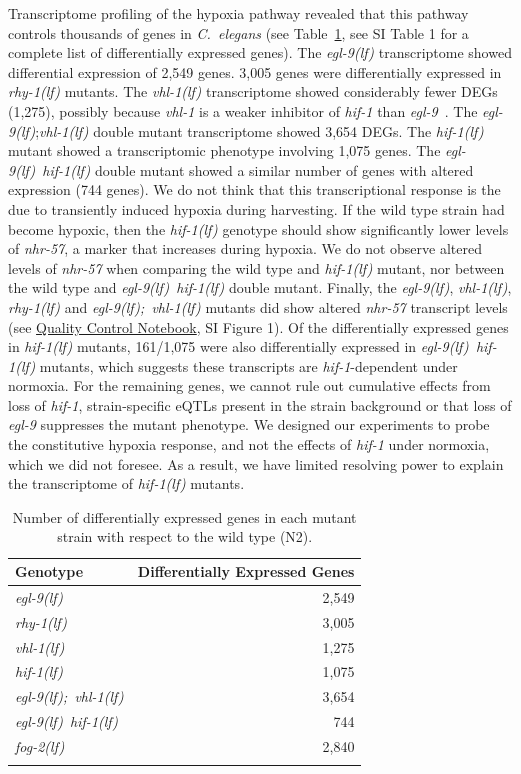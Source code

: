 \documentclass[9pt,twocolumn,twoside]{pnas-new}
\newcommand{\cel}{\emph{C.~elegans}}
\newcommand{\gene}[1]{\mbox{\emph{#1}}}
\newcommand{\fog}{\gene{fog-2(lf)}}
\newcommand{\egl}{\gene{egl-9(lf)}}
\newcommand{\rhy}{\gene{rhy-1(lf)}}
\newcommand{\vhl}{\gene{vhl-1(lf)}}
\newcommand{\eglvhl}{\gene{egl-9(lf); vhl-1(lf)}}
\newcommand{\eglhif}{\gene{egl-9(lf) hif-1(lf)}}
\newcommand{\hif}{\gene{hif-1(lf)}}
\newcommand{\egln}{2,549}
\newcommand{\rhyn}{3,005}
\newcommand{\vhln}{1,275}
\newcommand{\eglvhln}{3,654}
\newcommand{\hifn}{1,075}
\newcommand{\eglhifn}{744}
\newcommand{\fogn}{2,840}
\begin{document}
Transcriptome profiling of the hypoxia pathway revealed that this pathway
controls thousands of genes in \cel{} (see Table~\ref{tab:genes}, see
SI Table 1 for a complete list of differentially expressed genes).
The \egl{}
transcriptome showed differential expression of \egln{} genes. \rhyn{} genes
were differentially expressed in \rhy{} mutants. The \vhl{} transcriptome showed
considerably fewer DEGs (\vhln{}), possibly because \gene{vhl-1} is a weaker
inhibitor of \gene{hif-1} than \gene{egl-9}~\cite{Shao2009}. The \egl{};\vhl{}
double mutant transcriptome showed \eglvhln{} DEGs. The \hif{} mutant showed a
transcriptomic phenotype involving \hifn{} genes. The \eglhif{} double mutant
showed a similar number of genes with altered expression (\eglhifn{} genes).
\color{purple}
We do not think that this transcriptional response is the due to transiently
induced hypoxia during harvesting. If the wild type strain had become hypoxic,
then the \hif{} genotype should show significantly lower levels of
\gene{nhr-57}, a marker that increases during hypoxia. We do not observe altered
levels of \gene{nhr-57} when comparing the wild type and \hif{} mutant, nor
between the wild type and \eglhif{} double mutant. Finally, the \egl{}, \vhl{},
\rhy{} and \eglvhl{} mutants did show altered \gene{nhr-57} transcript levels
(see
\href{https://wormlabcaltech.github.io/mprsq/analysis_notebooks/5_quality_check.html}{
Quality Control Notebook}, SI Figure 1). Of the differentially expressed genes
in \hif{} mutants, 161/\hifn{} were also differentially expressed in \eglhif{}
mutants, which suggests these transcripts are \gene{hif-1}-dependent under
normoxia. For the remaining genes, we cannot rule out cumulative effects from
loss of \gene{hif-1}, strain-specific eQTLs present in the strain background or
that loss of \gene{egl-9} suppresses the mutant phenotype. We designed our
experiments to probe the constitutive hypoxia response, and not the effects of
\gene{hif-1} under normoxia, which we did not foresee. As a result, we have
limited resolving power to explain the transcriptome of \hif{} mutants.
\color{black}

\begin{table}[tbhp]
  \centering
  \begin{tabular}{lr}
    \toprule{}
    Genotype & Differentially Expressed Genes\\
    \midrule{}\egl{} & \egln{}\\
    \rhy{} & \rhyn{}\\
    \vhl{} & \vhln{}\\
    \hif{} & \hifn{}\\
    \eglvhl{} & \eglvhln{}\\
    \eglhif{} & \eglhifn{}\\
    \fog{} & \fogn{}\\
    \bottomrule{}
  \end{tabular}
  \caption{Number of differentially expressed genes in each mutant strain with
  respect to the wild type (N2).}
\label{tab:genes}
\end{table}
\end{document}
